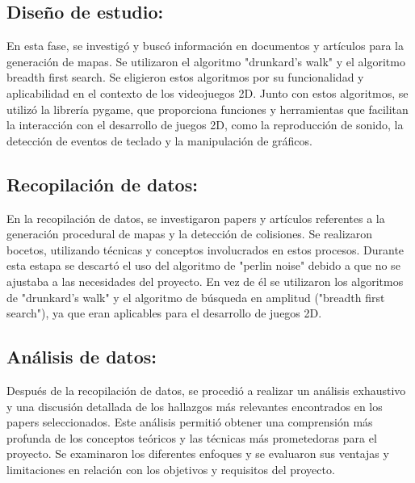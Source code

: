 \documentclass[stu, 12pt, letterpaper, donotrepeattitle, floatsintext, natbib]{apa7}
\begin{document}
\subsection{Diseño de estudio:}
En esta fase, se investigó y buscó información en documentos y artículos para la generación de mapas. Se utilizaron el algoritmo "drunkard's walk" y el algoritmo breadth first search.
Se eligieron estos algoritmos por su funcionalidad y aplicabilidad en el contexto de los videojuegos 2D. Junto con estos algoritmos, se utilizó la librería pygame, que proporciona funciones y herramientas que facilitan la interacción con el desarrollo de juegos 2D, como la reproducción de sonido, la detección de eventos de teclado y la manipulación de gráficos.
\subsection{Recopilación de datos:}
En la recopilación de datos, se investigaron papers y artículos referentes a la generación procedural de mapas y la detección de colisiones. Se realizaron bocetos, utilizando técnicas y conceptos involucrados en estos procesos. Durante esta estapa se descartó el uso del algoritmo de "perlin noise" debido a que no se ajustaba a las necesidades del proyecto. En vez de él se utilizaron  los algoritmos de "drunkard's walk" y el algoritmo de búsqueda en amplitud ("breadth first search"), ya que eran aplicables para el desarrollo de juegos 2D.
\subsection{Análisis de datos:}
Después de la recopilación de datos, se procedió a realizar un análisis exhaustivo y una discusión detallada de los hallazgos más relevantes encontrados en los papers seleccionados. Este análisis permitió obtener una comprensión más profunda de los conceptos teóricos y las técnicas más prometedoras para el proyecto. Se examinaron los diferentes enfoques y se evaluaron sus ventajas y limitaciones en relación con los objetivos y requisitos del proyecto.
\end{document}
